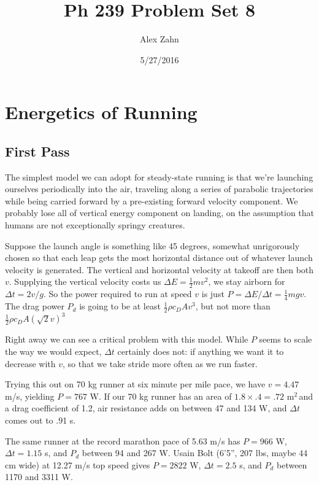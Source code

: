 \documentclass[12pt]{article}
\title{Ph 239 Problem Set 8}
\author{Alex Zahn}
\date{5/27/2016}
\begin{document}
\maketitle

\newcommand{\wmsq}{W/\(\mathrm{m}^2\,\)}
\newcommand{\msq}{\(\mathrm{m}^2\,\)}
\newcommand{\micron}{\(\mu\mathrm{m}\)\,}
\newcommand{\mcb}{\(\mathrm{m}^3\,\)}
\newcommand{\msqr}{m\(^2\)}


\section{Energetics of Running}

\subsection{First Pass}

The simplest model we can adopt for steady-state running is that we're launching ourselves periodically into the air, traveling along a series of parabolic trajectories while being carried forward by a pre-existing forward velocity component. We probably lose all of vertical energy component on landing, on the assumption that humans are not exceptionally springy creatures.

Suppose the launch angle is something like 45 degrees, somewhat unrigorously chosen so that each leap gets the most horizontal distance out of whatever launch velocity is generated. The vertical and horizontal velocity at takeoff are then both \(v\). Supplying the vertical velocity costs us \(\Delta E = \frac{1}{2}mv^2\), we stay airborn for \(\Delta t = 2v/g\). So the power required to run at speed \(v\) is just \(P = \Delta E / \Delta t=\frac{1}{4}mgv\). The drag power \(P_d\) is going to be at least \(\frac{1}{2}\rho c_D A v^3\), but not more than \(\frac{1}{2}\rho c_D A (\sqrt{2}v)^3\)

Right away we can see a critical problem with this model. While \(P\) seems to scale the way we would expect, \(\Delta t\) certainly does not: if anything we want it to decrease with \(v\), so that we take stride more often as we run faster. 

Trying this out on 70 kg runner at six minute per mile pace, we have \(v = 4.47\) m/s, yielding \(P = 767\) W. If our 70 kg runner has an area of \(1.8 \times .4 = .72\) \msq and a drag coefficient of 1.2, air resistance adds on between 47 and 134 W, and \(\Delta t\) comes out to .91 s.

The same runner at the record marathon pace of 5.63 m/s has \(P = 966\) W, \(\Delta t = 1.15\) s, and \(P_d\) between 94 and 267 W. Usain Bolt (6'5'', 207 lbs, maybe 44 cm wide) at 12.27 m/s top speed gives \(P = 2822\) W, \(\Delta t = 2.5\) s, and \(P_d\) between 1170 and 3311 W.
\end{document}
